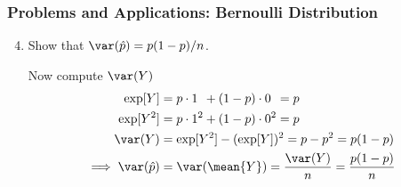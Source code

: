 \begin{frame}
\frametitle{Problems and Applications: Bernoulli Distribution}
\ask
\begin{enumerate}\setcounter{enumi}{3}

\item Show that $\var(\hat{p})=p(1-p)/n$.

\begin{answer}
Now compute $\var(Y)$
\begin{align*}
\exp[Y]
  & = p \cdot 1\phantom{^2} + (1-p) \cdot 0\phantom{^2} 
   = p\\
\exp[Y^2]
 & = p \cdot 1^2 + (1-p) \cdot 0^2 
   = p\\
\var(Y) 
 & = \exp[Y^2] - (\exp[Y])^2
   = p - p^2
   = p(1-p)\\
\implies 
\var(\hat{p}) 
 & = \var(\mean{Y}) 
   = \frac{\var(Y)}{n}
   = \frac{p(1-p)}{n}
\end{align*}
\end{answer}

\end{enumerate}
\end{frame}



